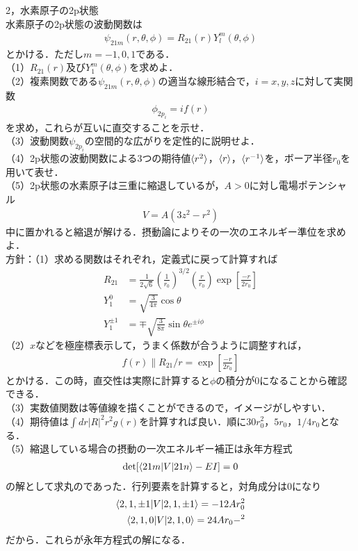 \documentclass[a4j]{jarticle}
\begin{document}
2，水素原子の2p状態\\
水素原子の2p状態の波動関数は
\begin{align*}
 \psi_{21m}(r,\theta,\phi)=R_{21}(r)Y_l^m(\theta,\phi)
\end{align*}
とかける．ただし$m=-1,0,1$である．\\
（1）$R_{21}(r)$及び$Y_1^m(\theta,\phi)$を求めよ．\\
（2）複素関数である$\psi_{21m}(r,\theta,\phi)$の適当な線形結合で，$i=x,y,z$に対して実関数
\begin{align*}
 \phi_{2p_i}=if(r)
\end{align*}
を求め，これらが互いに直交することを示せ．\\
（3）波動関数$\psi_{2p_i}$の空間的な広がりを定性的に説明せよ．\\
（4）2p状態の波動関数による$3$つの期待値$\braket{r^2}$，$\braket{r}$，$\braket{r^{-1}}$を，ボーア半径$r_0$を用いて表せ．\\
（5）2p状態の水素原子は三重に縮退しているが，$A>0$に対し電場ポテンシャル
\begin{align*}
 V=A(3z^2-r^2)
\end{align*}
中に置かれると縮退が解ける．摂動論によりその一次のエネルギー準位を求めよ．\\

方針：（1）求める関数はそれぞれ，定義式に戻って計算すれば
\begin{align*}
 R_{21}&=\frac{1}{2\sqrt{6}}\left(\frac{1}{r_0}\right)^{3/2}\left(\frac{r}{r_0}\right)
 \exp\left[\frac{-r}{2r_0}\right]\\
 Y_1^0&=\sqrt{\frac{3}{4\pi}}\cos\theta \\
 Y_1^{\pm 1}&=\mp \sqrt{\frac{3}{8\pi}}\sin\theta e^{\pm i\phi}
\end{align*}
（2）$x$などを極座標表示して，うまく係数が合うように調整すれば，
\begin{align*}
 f(r)\parallel R_{21}/r=\exp\left[\frac{-r}{2r_0}\right]
\end{align*}
とかける．この時，直交性は実際に計算すると$\phi$の積分が$0$になることから確認できる．\\
（3）実数値関数は等値線を描くことができるので，イメージがしやすい．\\
（4）期待値は$\int dr|R|^2r^2g(r)$を計算すれば良い．順に$30r_0^2$，$5r_0$，$1/4r_0$となる．\\
（5）縮退している場合の摂動の一次エネルギー補正は永年方程式
\begin{align*}
 \det [\braket{21m|V|21n}-EI ]=0
\end{align*}
の解として求丸のであった．行列要素を計算すると，対角成分は$0$になり
\begin{align*}
 \braket{2,1,\pm 1|V|2,1,\pm 1}=-12Ar_0^2\\
 \braket{2,1,0 |V|2,1,0}=24Ar_0-^2
\end{align*}
だから．これらが永年方程式の解になる．\\
\end{document}
